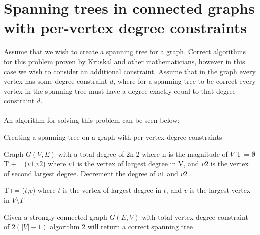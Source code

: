 \documentclass{article}
\begin{document}
	\section{Spanning trees in connected graphs with per-vertex degree constraints}
	Assume that we wish to create a spanning tree for a graph. Correct algorithms for this problem proven by Kruskal and other
	mathematicians, however in this case we wish to consider an additional constraint. Assume that in the graph every vertex has some degree constraint $d$,
	where for a spanning tree to be correct every vertex in the spanning tree must have a degree exactly equal to that degree constraint $d$. 
	\\\\
	An algorithm for solving this problem can be seen below:
	\\
		\begin{algorithm}[H]
		\caption{Creating a spanning tree on a graph with per-vertex degree constraints}
		\begin{algorithmic}[1]
			\State Graph $G(V,E)$ with a total degree of 2n-2 where n is the magnitude of $V$
			\State T = $\emptyset$
			\State T += ($v1$,$v2$) where $v1$ is the vertex of largest degree in V, and $v2$ is the vertex of second largest degree. Decrement the degree of $v1$ and $v2$
			\State \parbox[t]{\dimexpr\linewidth-\algorithmicindent}{T+= ($t$,$v$) where $t$ is the vertex of largest degree in $t$, and $v$ is the largest vertex in $V$\textbackslash$T$\strut}
			\EndWhile
		\end{algorithmic}
	\newpage
	\end{algorithm}

	\begin{theorem}
		Given a strongly connected graph $G(E,V)$ with total vertex degree constraint of $2(|V|-1)$ algorithm 2 will return a correct spanning tree
	\end{theorem}
\end{document}
